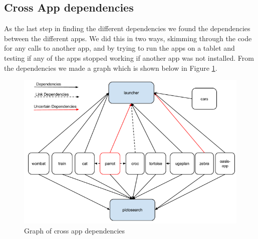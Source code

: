 \subsection{Cross App dependencies}
As the last step in finding the different dependencies we found the dependencies between the different apps. We did this in two ways, skimming through the code for any calls to another app, and by trying to run the apps on a tablet and testing if any of the apps  stopped working if another app was not installed. From the dependencies we made a graph which is shown below in Figure \ref{AppAppdependencies}.

\begin{figure}[H]
	\centering
	\includegraphics[width=0.8 \textwidth]{pictures/AppAppdependencies.png}
	\caption{Graph of cross app dependencies}
	\label{AppAppdependencies}
\end{figure}
